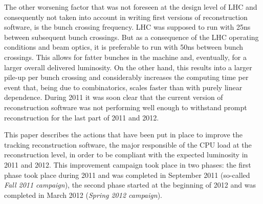 The other worsening factor that was not foreseen at the design level
of LHC and consequently not taken into account in writing first
versions of reconstruction software, is the bunch crossing
frequency. LHC was supposed to run with 25ns between subsequent bunch
crossings. But as a consequence of the LHC operating conditions and
beam optics, it is preferable to run with 50ns between bunch
crossings. This allows for fatter bunches in the machine and,
eventually, for a larger overall delivered luminosity. On the other
hand, this results into a larger pile-up per bunch crossing and
considerably increases the computing time per event that, being due to
combinatorics, scales faster than with purely linear dependence.
During 2011 it was soon clear that the current version of
reconstruction software was not performing well enough to withstand prompt
reconstruction for the last part of 2011 and 2012. 

This paper describes the actions that have been put in place to
improve the tracking reconstruction software, the major responsible of
the CPU load at the reconstruction level, in order to be compliant
with the expected luminosity in 2011 and 2012. This improvement
campaign took place in two phases: the first phase took place during
2011 and was completed in September 2011 (so-called {\em Fall 2011
  campaign}), the second phase started at the beginning of 2012 and
was completed in March 2012 ({\em Spring 2012 campaign}).